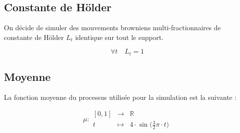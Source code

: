 \subsection{Constante de Hölder
}

On décide de simuler des mouvements browniens multi-fractionnaires de constante de Hölder $L_t$ identique sur tout le support.  

$$\forall t \quad L_t = 1$$


\subsection{Moyenne}


\begin{minipage}{0.47\linewidth}

	La fonction moyenne du processus utilisée pour la simulation est la suivante :

	$$
		\mu : \begin{array}{ccc}
			[0,1] & \longrightarrow & \mathbb R
			\\
			t     & \longmapsto     & 4 \cdot \sin\bigl( \frac 3 2 \pi \cdot t \bigr)
		\end{array}
	$$
\end{minipage}
\hfill
\begin{minipage}{0.47\linewidth}
	\begin{figure}[H]
		\centering
		\label{plot:mu}
	\end{figure}
\end{minipage}







